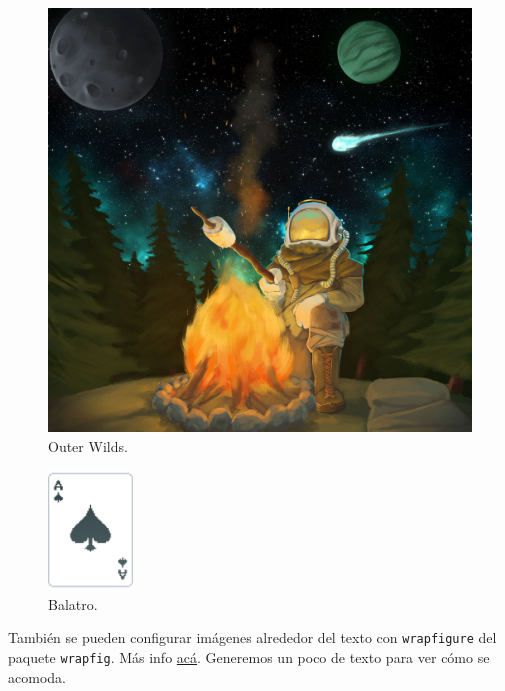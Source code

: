 \documentclass[12pt, spanish]{report}
\theoremstyle{definition} %
\theoremstyle{remark} %
\theoremstyle{plain} %
\theoremstyle{plain} %
\theoremstyle{plain} %
\theoremstyle{plain} %
\theoremstyle{plain} %
\theoremstyle{remark} %
\numberwithin{defn}{chapter}
\begin{document}
\begin{figure}[hbt!]
    \begin{center}
        \includegraphics[scale=0.08]{imagenes/outer wilds.jpeg}
        \caption{Outer Wilds.}
        \label{fig:outer wilds}
    \end{center}
\end{figure}

\begin{figure}
  \begin{center}
    \includegraphics[width=0.2\textwidth]{imagenes/balatro.pdf}
  \caption{Balatro.}
  \end{center}
\end{figure}

También se pueden configurar imágenes alrededor del texto con \verb|wrapfigure| del paquete \verb|wrapfig|. Más info \href{https://www.overleaf.com/learn/latex/Wrapping_text_around_figures}{acá}. Generemos un poco de texto para ver cómo se acomoda.
\end{document}
